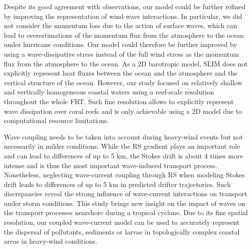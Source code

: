 Despite its good agreement with observations, our model could be further refined by improving the representation of wind-wave interactions. In particular, we did not consider the momentum loss due to the action of surface waves, which can lead to overestimations of the momentum flux from the atmosphere to the ocean under hurricane conditions. Our model could therefore be further improved by using a wave-dissipative stress instead of the full wind stress as the momentum flux from the atmosphere to the ocean. As a 2D barotropic model, SLIM does not explicitly represent heat fluxes between the ocean and the atmosphere and the vertical structure of the ocean. However, our study focused on relatively shallow and vertically homogeneous coastal waters using a reef-scale resolution throughout the whole FRT. Such fine resolution allows to explicitly represent wave dissipation over coral reefs and is only achievable using a 2D model due to computational resource limitations.

Wave coupling needs to be taken into account during heavy-wind events but not necessarily in milder conditions. While the RS gradient plays an important role and can lead to differences of up to 5 km, the Stokes drift is about 4 times more intense and is thus the most important wave-induced transport process. Nonetheless, neglecting wave-current coupling through RS when modeling Stokes drift leads to differences of up to 5 km in predicted drifter trajectories. Such discrepancies reveal the strong influence of wave-current interactions on transport under storm conditions. This study brings new insight on the impact of waves on the transport processes nearshore during a tropical cyclone. Due to its fine spatial resolution, our coupled wave-current model can be used to accurately represent the dispersal of pollutants, sediments or larvae in topologically complex coastal areas in heavy-wind conditions.  
